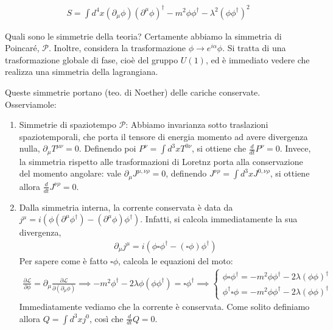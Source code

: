 \documentclass{report}
\begin{document}
\begin{align}
    S = \int d^4 x (\partial_\mu \phi)(\partial^\mu \phi)^\dagger - m^2 \phi \phi^\dagger - \lambda^2(\phi\phi^\dagger)^2
\end{align}

Quali sono le simmetrie della teoria? Certamente abbiamo la simmetria di Poincaré, \(\mathcal{P}\). Inoltre, considera la trasformazione \(\phi \to e^{i\alpha}\phi\). Si tratta di una trasformazione globale di fase, cioè del gruppo \(U(1)\), ed è immediato vedere che realizza una simmetria della lagrangiana. 

Queste simmetrie portano (teo. di Noether) delle cariche conservate. Osserviamole: 

\begin{enumerate}
    \item Simmetrie di spaziotempo \(\mathcal{P}\): Abbiamo invarianza sotto traslazioni spaziotemporali, che porta il tensore di energia momento ad avere divergenza nulla, \(\partial_\mu T^{\mu\nu} = 0\). Definendo poi \(P^\nu = \int d^3x T^{0\nu}\), si ottiene che \(\frac{d}{dt}P^\nu = 0\). Invece, la simmetria rispetto alle trasformazioni di Loretnz porta alla conservazione del momento angolare: vale \(\partial_\mu J^{\mu, \nu \rho} = 0\), definendo \(J^{\nu\rho} = \int d^3x J^{0, \nu\rho}\), si ottiene allora \(\frac{d}{dt}J^{\nu\rho} = 0\).
    \item Dalla simmetria interna, la corrente conservata è data da \(j^\mu = i(\phi(\partial^\mu\phi^\dagger) - (\partial^\mu\phi)\phi^\dagger)\). Infatti, si calcola immediatamente la sua divergenza, 
    \begin{align}
        \partial_\mu j^\mu = i(\phi \square \phi^\dagger - (\square \phi)\phi^\dagger)
    \end{align}
    Per sapere come è fatto \(\square \phi\), calcola le equazioni del moto: 
    \begin{align}
        \frac{\partial \mathcal{L}}{\partial \phi} = \partial_\mu \frac{\partial \mathcal{L}}{\partial (\partial_\mu\phi)} \implies -m^2\phi^\dagger -2\lambda\phi(\phi\phi^\dagger) = \square \phi^\dagger \implies \begin{cases}
            \phi\square\phi^\dagger = -m^2\phi\phi^\dagger - 2\lambda(\phi\phi)^\dagger \\
            \phi^\dagger\square\phi = -m^2\phi\phi^\dagger - 2\lambda(\phi\phi)^\dagger
        \end{cases}
    \end{align}
    Immediatamente vediamo che la corrente è conservata. Come solito definiamo allora \(Q = \int d^3x j^0\), così che \(\frac{d}{dt}Q = 0\). 
\end{enumerate}
\end{document}
